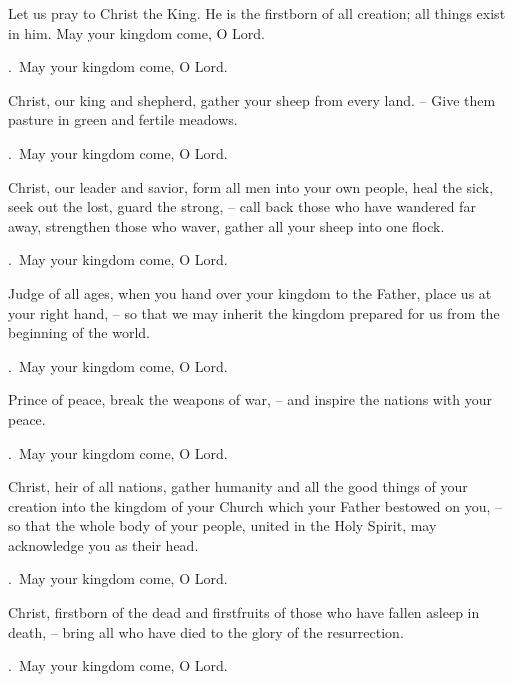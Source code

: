 \lettrine[loversize=0.15,lines=2]{L}{}et us pray to Christ the King. He is the firstborn of all creation; all things exist in him. May your kingdom come, O Lord.
\par \Rbar.~May your kingdom come, O Lord.

Christ, our king and shepherd, gather your sheep from every land.
– Give them pasture in green and fertile meadows.
\par \Rbar.~May your kingdom come, O Lord.

Christ, our leader and savior, form all men into your own people, heal the sick, seek out the lost, guard the strong,
– call back those who have wandered far away, strengthen those who waver, gather all your sheep into one flock.
\par \Rbar.~May your kingdom come, O Lord.

Judge of all ages, when you hand over your kingdom to the Father, place us at your right hand,
– so that we may inherit the kingdom prepared for us from the beginning of the world.
\par \Rbar.~May your kingdom come, O Lord.

Prince of peace, break the weapons of war,
– and inspire the nations with your peace.
\par \Rbar.~May your kingdom come, O Lord.

Christ, heir of all nations, gather humanity and all the good things of your creation into the kingdom of your Church which your Father bestowed on you,
– so that the whole body of your people, united in the Holy Spirit, may acknowledge you as their head.
\par \Rbar.~May your kingdom come, O Lord.

Christ, firstborn of the dead and firstfruits of those who have fallen asleep in death,
– bring all who have died to the glory of the resurrection.
\par \Rbar.~May your kingdom come, O Lord.
